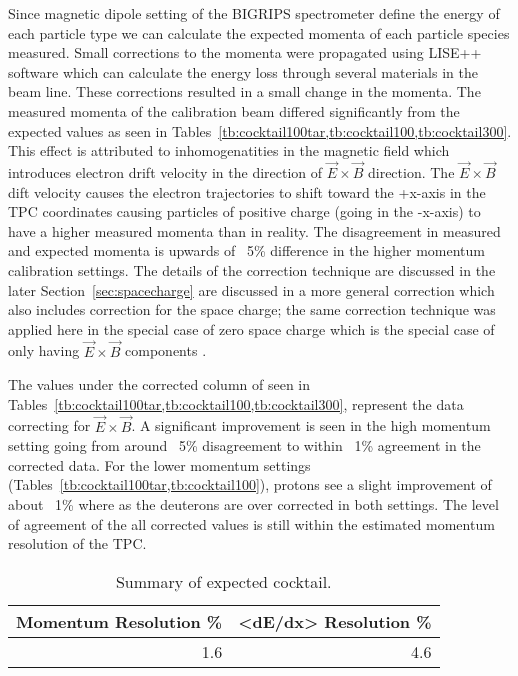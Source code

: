 Since magnetic dipole setting of the BIGRIPS spectrometer define the energy of each particle type we can calculate the expected momenta of each particle species measured. Small corrections to the momenta were propagated using LISE++ software which can calculate the energy loss through several materials in the beam line. These corrections resulted in a small change in the momenta. The measured momenta of the calibration beam differed significantly from the expected values as seen in Tables~\cref{tb:cocktail100tar,tb:cocktail100,tb:cocktail300}. This effect is attributed to inhomogenatities in the magnetic field which introduces electron drift velocity in the direction of $\vec{E}\times\vec{B}$ direction. The $\vec{E}\times\vec{B}$ dift velocity causes the electron trajectories to shift toward the +x-axis in the TPC coordinates causing particles of positive charge (going in the -x-axis) to have a higher measured momenta than in reality. The disagreement in measured and expected momenta is upwards of ~5\% difference in the higher momentum calibration settings. The details of the correction technique are discussed in the later Section~\ref{sec:spacecharge} are discussed in a more general correction which also includes correction for the space charge; the same correction technique was applied here in the special case of zero space charge which is the special case of only having $\vec{E}\times\vec{B}$ components .

The values under the corrected column of seen in Tables~\cref{tb:cocktail100tar,tb:cocktail100,tb:cocktail300}, represent the data correcting for $\vec{E}\times\vec{B}$. A significant improvement is seen in the high momentum setting going from around ~5\% disagreement to within ~1\% agreement in the corrected data. For the lower momentum settings (Tables~\cref{tb:cocktail100tar,tb:cocktail100}), protons see a slight improvement of about ~1\% where as the deuterons are over corrected in both settings. The level of agreement of the all corrected values is still within the estimated momentum resolution of the TPC. 

\begin{table*}\centering
{}
\begin{tabular}{@{}rr@{}}\toprule
Momentum Resolution \% & <dE/dx> Resolution \% \\
\midrule
1.6  & 4.6\\
\bottomrule
\end{tabular}
\caption{Summary of expected cocktail. }
\label{tb:momresolution}
\end{table*}

